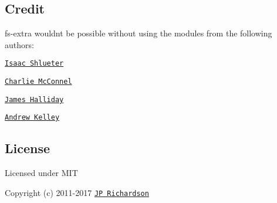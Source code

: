 \subsection*{Credit }

{\ttfamily fs-\/extra} wouldn\textquotesingle{}t be possible without using the modules from the following authors\+:


\begin{DoxyItemize}
\item \href{https://github.com/isaacs}{\tt Isaac Shlueter}
\item \href{https://github.com/avianflu}{\tt Charlie Mc\+Connel}
\item \href{https://github.com/substack}{\tt James Halliday}
\item \href{https://github.com/andrewrk}{\tt Andrew Kelley}
\end{DoxyItemize}

\subsection*{License }

Licensed under M\+IT

Copyright (c) 2011-\/2017 \href{https://github.com/jprichardson}{\tt JP Richardson} 